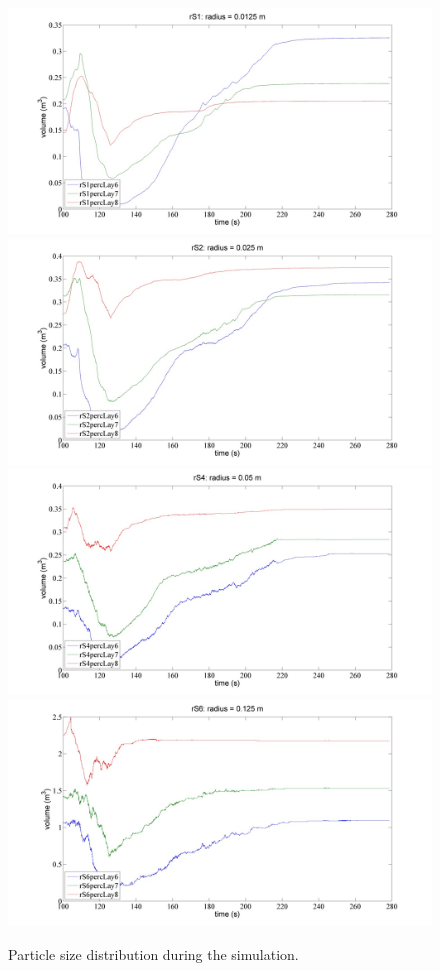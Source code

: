 \begin{figure}[htbp]
\centering 
  \subfloat%
  {
	  \includegraphics[width=.70\columnwidth]{091rS120150824174530}
	  \label{fig:091rS120150824174530}
  }
  \\
    \subfloat
    {
	  \includegraphics[width=.70\columnwidth]{092rS220150824174530}
	  \label{fig:092rS220150824174530}
  }
  \\
  \subfloat%
  {
	  \includegraphics[width=.70\columnwidth]{093rS420150824174530}
	  \label{fig:093rS420150824174530}
  }
  \\
    \subfloat%
    {
	  \includegraphics[width=.70\columnwidth]{094rS620150824174530}
	  \label{fig:094rS620150824174530}  }
  \\
  \caption{Particle size distribution during the simulation.}
  \label{fig:096sinterplots}
\end{figure}